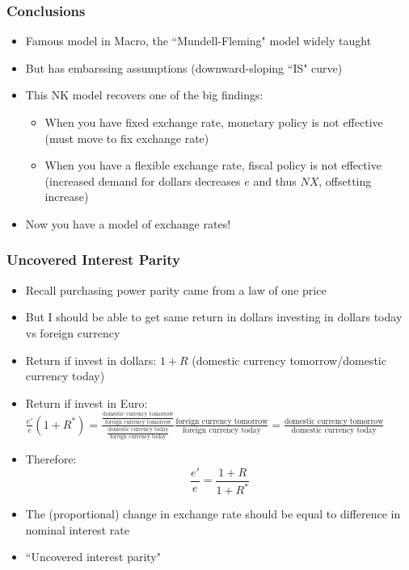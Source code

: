 \documentclass{beamer}
\begin{document}
\begin{frame}
\frametitle[alignment=center]{Conclusions}
\begin{itemize}
\item Famous model in Macro, the ``Mundell-Fleming" model widely taught
\bigskip
\item But has embarssing assumptions (downward-sloping ``IS" curve) 
\bigskip
\item This NK model recovers one of the big findings:
\begin{itemize}
\item When you have fixed exchange rate, monetary policy is not effective (must move to fix exchange rate)
\bigskip
\item When you have a flexible exchange rate, fiscal policy is not effective (increased demand for dollars decreases $e$ and thus $NX$, offsetting increase)
\end{itemize}
\bigskip
\item Now you have a model of exchange rates!
\end{itemize}
\end{frame}

\begin{frame}
\frametitle[alignment=center]{Uncovered Interest Parity}
\begin{itemize}
\item Recall purchasing power parity came from a law of one price
\bigskip
\item But I should be able to get same return in dollars investing in dollars today vs foreign currency
\bigskip
\item Return if invest in dollars:  $1+R$ (domestic currency tomorrow/domestic currency today)
\item Return if invest in Euro: $\frac{e'}{e}(1+R^*)=\frac{\frac{\text{domestic currency tomorrow}}{\text{foreign currency tomorrow}}}{\frac{\text{domestic currency today}}{\text{foreign currency today}}}\frac{\text{foreign currency tomorrow}}{\text{foreign currency today}}=\frac{\text{domestic currency tomorrow}}{\text{domestic currency today}}$
\item Therefore:
$$\frac{e'}{e}=\frac{1+R}{1+R^*}$$
\item The (proportional) change in exchange rate should be equal to difference in nominal interest rate
\item ``Uncovered interest parity" 
\end{itemize}
\end{frame}
\end{document}

